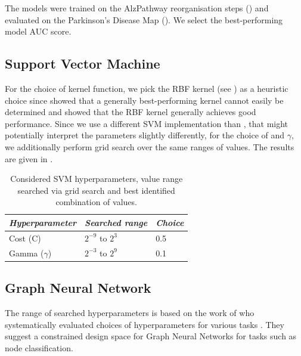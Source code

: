 \documentclass[
	fontsize=10pt, %
	twoside=false, %
	secnumdepth=1, %
  toc=indentunnumbered %
]{kaobook}
\begin{document}
The models were trained on the AlzPathway reorganisation steps (\ADMap)
and evaluated on the Parkinson's Disease Map (\PDMap). We select the
best-performing model \wrt AUC score.

\subsection{Support Vector Machine}

For the choice of kernel function, we pick the RBF kernel (see
) as a heuristic choice since
\citeauthor{nielsen_MachineLearningSupport_2019} showed that a generally
best-performing kernel cannot easily be determined and showed that the RBF
kernel generally achieves good performance.
%
Since we use a different SVM implementation than \nielsen, that might
potentially interpret the parameters slightly differently, for the choice of
 and $\gamma$, we additionally perform grid search over the same ranges
of values.
%
The results are given in
.

\begin{table}[h]
  \begin{tabular}[h]{| l | l | l |}
    \textit{Hyperparameter} & \textit{Searched range} & \textit{Choice} \\
    \hline
    Cost (C) & $2^{-9}$ to $2^3$ & 0.5 \\
    Gamma ($\gamma$) & $2^{-3}$ to $2^{9}$ & 0.1
  \end{tabular}
  \caption{Considered SVM hyperparameters, value range searched via grid search and
    best identified combination of values.}
  \label{tab:svm-hyperparams}
\end{table}



\subsection{Graph Neural Network}

The range of searched hyperparameters is based on the work of
\citeauthor{you_design_2020} who systematically evaluated choices of hyperparameters for
various tasks \cite{you_design_2020}. They suggest a constrained design space
for Graph Neural Networks for tasks such as node classification.  
\end{document}
